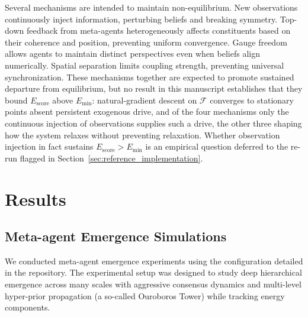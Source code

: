 \documentclass[11pt]{article}
\begin{document}
Several mechanisms are intended to maintain non-equilibrium. New observations continuously inject information, perturbing beliefs and breaking symmetry. Top-down feedback from meta-agents heterogeneously affects constituents based on their coherence and position, preventing uniform convergence. Gauge freedom allows agents to maintain distinct perspectives even when beliefs align numerically. Spatial separation limits coupling strength, preventing universal synchronization. These mechanisms together are expected to promote sustained departure from equilibrium, but no result in this manuscript establishes that they bound $E_{\mathrm{score}}$ above $E_{\min}$: natural-gradient descent on $\mathcal{F}$ converges to stationary points absent persistent exogenous drive, and of the four mechanisms only the continuous injection of observations supplies such a drive, the other three shaping how the system relaxes without preventing relaxation. Whether observation injection in fact sustains $E_{\mathrm{score}} > E_{\min}$ is an empirical question deferred to the re-run flagged in Section~\ref{sec:reference_implementation}.

\section{Results}
\label{sec:results}
\subsection{Meta-agent Emergence Simulations}
\label{sec:meta_agent_emergence}

We conducted meta-agent emergence experiments using the configuration detailed in the repository. The experimental setup was designed to study deep hierarchical emergence across many scales with aggressive consensus dynamics and multi-level hyper-prior propagation (a so-called Ouroboros Tower) while tracking energy components.
\end{document}
